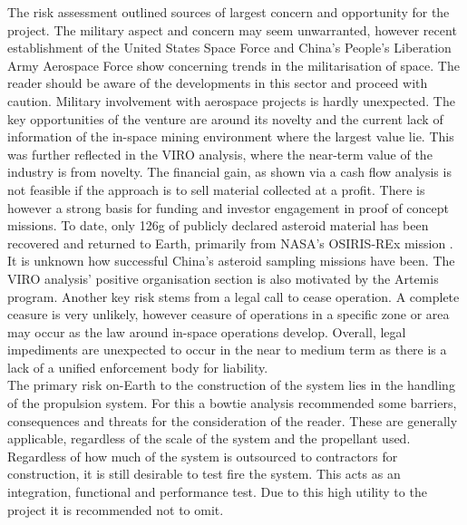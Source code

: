 \documentclass[conference]{IEEEtran}
\begin{document}
The risk assessment outlined sources of largest concern and opportunity for the project. The military aspect and concern may seem unwarranted, however recent establishment of the United States Space Force and China's People's Liberation Army Aerospace Force show concerning trends in the militarisation of space. The reader should be aware of the developments in this sector and proceed with caution. Military involvement with aerospace projects is hardly unexpected. The key opportunities of the venture are around its novelty and the current lack of information of the in-space mining environment where the largest value lie. This was further reflected in the VIRO analysis, where the near-term value of the industry is from novelty. The financial gain, as shown via a cash flow analysis is not feasible if the approach is to sell material collected at a profit. There is however a strong basis for funding and investor engagement in proof of concept missions. To date, only 126g of publicly declared asteroid material has been recovered and returned to Earth, primarily from NASA's OSIRIS-REx mission \cite{barry-2024}. It is unknown how successful China's asteroid sampling missions have been. The VIRO analysis' positive organisation section is also motivated by the Artemis program. Another key risk stems from a legal call to cease operation. A complete ceasure is very unlikely, however ceasure of operations in a specific zone or area may occur as the law around in-space operations develop. Overall, legal impediments are unexpected to occur in the near to medium term as there is a lack of a unified enforcement body for liability. \\

The primary risk on-Earth to the construction of the system lies in the handling of the propulsion system. For this a bowtie analysis recommended some barriers, consequences and threats for the consideration of the reader. These are generally applicable, regardless of the scale of the system and the propellant used. Regardless of how much of the system is outsourced to contractors for construction, it is still desirable to test fire the system. This acts as an integration, functional and performance test. Due to this high utility to the project it is recommended not to omit. \\
\end{document}
